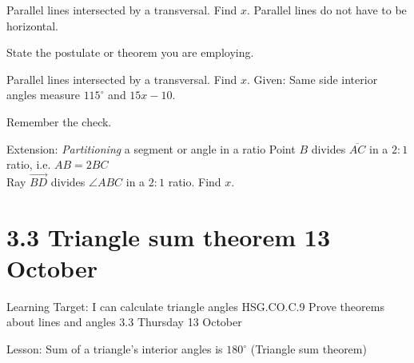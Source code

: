 \begin{frame}{Parallel lines intersected by a transversal. Find $x$.}
  {Parallel lines do not have to be horizontal.}
  \begin{flushleft}
    \end{flushleft}
    State the postulate or theorem you are employing.
\end{frame}

\begin{frame}{Parallel lines intersected by a transversal. Find $x$.}
  Given: Same side interior angles measure $115^\circ$ and $15x-10$.
  \begin{flushleft}
    \end{flushleft} \vspace{1cm}
    Remember the check.
\end{frame}

\begin{frame}{Extension: \emph{Partitioning} a segment or angle in a ratio}
  Point $B$ divides $\overline{AC}$ in a $2:1$ ratio, i.e. $AB=2 BC$ \\
  Ray $\overrightarrow{BD}$ divides $\angle ABC$ in a $2:1$ ratio. Find $x$.
  
\end{frame}

\section{3.3 Triangle sum theorem \hfill 13 October}
\begin{frame}{Learning Target: I can calculate triangle angles}
  {HSG.CO.C.9 Prove theorems about lines and angles  \hfill \alert{3.3 Thursday 13 October}}

  Lesson: Sum of a triangle's interior angles is $180^\circ$ (Triangle sum theorem)
\end{frame}

